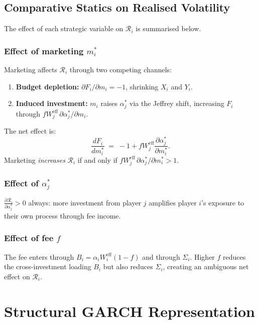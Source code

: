 \documentclass[12pt,a4paper]{article}
\newcommand{\1}{\mathbf{1}}
\begin{document}
\subsection{Comparative Statics on Realised Volatility}

The effect of each strategic variable on $\mathcal{R}_i$ is summarised below.

\subsubsection{Effect of marketing $m_i^*$}

Marketing affects $\mathcal{R}_i$ through two competing channels:
\begin{enumerate}[label=(\alph*)]
  \item \textbf{Budget depletion:} $\partial F_i/\partial m_i = -1$, shrinking $X_i$ and $Y_i$.
  \item \textbf{Induced investment:} $m_i$ raises $\alpha_j^*$ via the Jeffrey shift, increasing $F_i$ through $f W_j^{\mathrm{eff}}\,\partial\alpha_j^*/\partial m_i$.
\end{enumerate}
The net effect is:
\[
  \frac{dF_i}{dm_i^*} \;=\; -1 + fW_j^{\mathrm{eff}}\frac{\partial\alpha_j^*}{\partial m_i^*}.
\]
Marketing \emph{increases} $\mathcal{R}_i$ if and only if $fW_j^{\mathrm{eff}}\,\partial\alpha_j^*/\partial m_i^* > 1$.

\subsubsection{Effect of $\alpha_j^*$}

$\frac{\partial \mathcal{R}_i}{\partial \alpha_j^*} > 0$ always: more investment from player $j$ amplifies player $i$'s exposure to their own process through fee income.

\subsubsection{Effect of fee $f$}

The fee enters through $B_i = \alpha_i W_i^{\mathrm{eff}}(1-f)$ and through $\Sigma_i$. Higher $f$ reduces the cross-investment loading $B_i$ but also reduces $\Sigma_i$, creating an ambiguous net effect on $\mathcal{R}_i$.

\section{Structural GARCH Representation}
\end{document}
